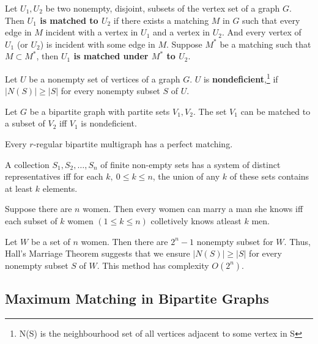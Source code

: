 \begin{definition}
	Let $U_1,U_2$ be two nonempty, disjoint, subsets of the vertex set of a graph $G$.
	Then \textbf{$U_1$ is matched to $U_2$} if there exists a matching $M$ in $G$ such that every edge in $M$ incident with a vertex in $U_1$ and a vertex in $U_2$.
	And every vertex of $U_1$ (or $U_2$) is incident with some edge in $M$.
	Suppose $M^*$ be a matching such that $M \subset M^*$, then \textbf{$U_1$ is matched under $M^*$ to $U_2$}.
\end{definition}

\begin{definition}
	Let $U$ be a nonempty set of vertices of a graph $G$.
	$U$ is \textbf{nondeficient},\footnote{N(S) is the neighbourhood set of all vertices adjacent to some vertex in S} if $|N(S)| \ge |S|$ for every nonempty subset $S$ of $U$.
\end{definition}

\begin{theorem}
	Let $G$ be a bipartite graph with partite sets $V_1,V_2$.
	The set $V_1$ can be matched to a subset of $V_2$ iff $V_1$ is nondeficient.
\end{theorem}
\begin{corollary}
	Every $r$-regular bipartite multigraph has a perfect matching.
\end{corollary}

\begin{theorem}
	A collection $S_1,S_2,\dots,S_n$ of finite non-empty sets has a system of distinct representatives iff for each $k,\ 0 \le k \le n$, the union of any $k$ of these sets contains at least $k$ elements.
\end{theorem}

\begin{remark}
	Suppose there are $n$ women.
	Then every women can marry a man she knows iff each subset of $k$ women $(1 \le k \le n)$ colletively knows atleast $k$ men. 
\end{remark}

\begin{remark}
	Let $W$ be a set of $n$ women.
	Then there are $2^n-1$ nonempty subset for $W$.
	Thus, Hall's Marriage Theorem suggests that we ensure $|N(S)| \ge |S|$ for every nonempty subset $S$ of $W$.
	This method has complexity $O(2^n)$.
\end{remark}

\subsection{Maximum Matching in Bipartite Graphs}

